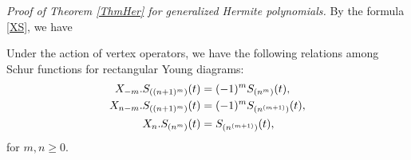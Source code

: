 \par\medskip
\noindent
{\em Proof of Theorem \ref{ThmHer} for generalized Hermite 
polynomials.} 
\quad 
By the formula \eqref{XS}, we have 
\begin{lem}
Under the action of vertex operators, we have the following 
relations among Schur functions for rectangular Young diagrams: 
\begin{equation}
\begin{align}
X_{-m} . S_{((n+1)^m)}(t)&=(-1)^m S_{(n^m)}(t), \notag \\
X_{n-m} . S_{((n+1)^m)}(t)&=(-1)^m S_{(n^{(m+1)})}(t), \\ 
X_n . S_{(n^m)}(t)&=S_{(n^{(m+1)})}(t), \notag 
\end{align}
\end{equation}
for $m,n\ge 0$. 
\end{lem}

